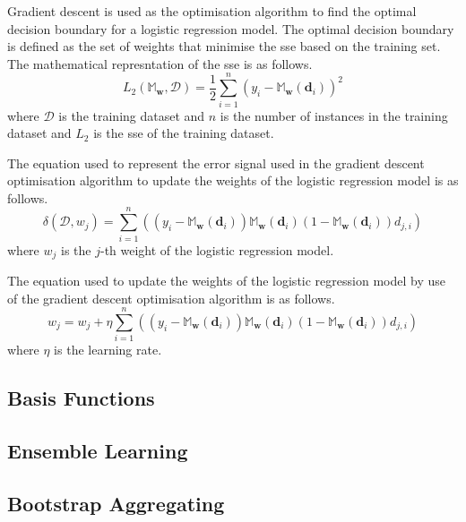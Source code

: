 \documentclass[10pt, conference]{IEEEtran}
\begin{document}
Gradient descent is used as the optimisation algorithm to find the optimal decision boundary for a logistic regression model.
The optimal decision boundary is defined as the set of weights that minimise the \acrfull{sse} based on the training set.
The mathematical represntation of the \acrshort{sse} is as follows.
\begin{equation}
    L_2\left(\mathbb{M}_{\textbf{w}}, \mathcal{D}\right) = \frac{1}{2} \sum_{i=1}^{n} \left( y_i - \mathbb{M}_{\textbf{w}}(\textbf{d}_i) \right)^2 \label{eq: sse_function}
\end{equation}
where $\mathcal{D}$ is the training dataset and $n$ is the number of instances in the training dataset and $L_2$ is the
\acrshort{sse} of the training dataset.

The equation used to represent the error signal used in the gradient descent optimisation algorithm to update the weights
of the logistic regression model is as follows.
\begin{equation}
    \delta(\mathcal{D}, w_j) = \sum_{i=1}^{n} \left((y_i - \mathbb{M}_{\textbf{w}}(\textbf{d}_i)) \mathbb{M}_{\textbf{w}}(\textbf{d}_i)
                                    (1-\mathbb{M}_{\textbf{w}}(\textbf{d}_i)) d_{j,i}\right) \label{eq: error_signal}
\end{equation}
where $w_j$ is the $j$-th weight of the logistic regression model.

The equation used to update the weights of the logistic regression model by use of the gradient descent optimisation algorithm
is as follows.
\begin{equation}
    w_j = w_j + \eta \sum_{i=1}^{n} \left((y_i - \mathbb{M}_{\textbf{w}}(\textbf{d}_i)) \mathbb{M}_{\textbf{w}}(\textbf{d}_i)
                            (1-\mathbb{M}_{\textbf{w}}(\textbf{d}_i)) d_{j,i}\right) \label{eq: weight_update}
\end{equation}
where $\eta$ is the learning rate.

\subsection{Basis Functions}

\subsection{Ensemble Learning}

\subsection{Bootstrap Aggregating}
\end{document}
